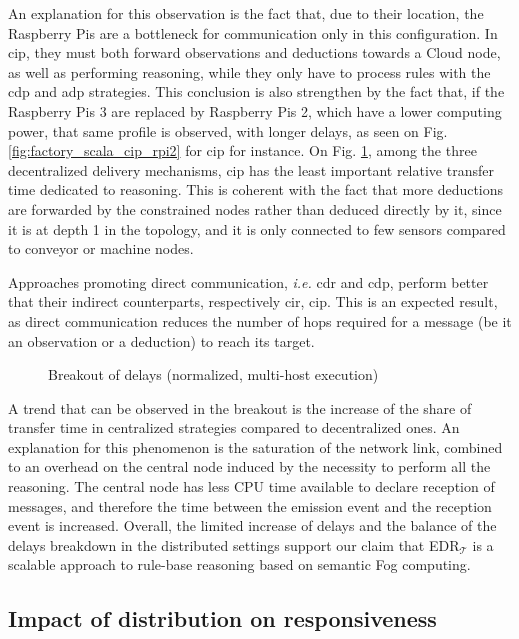 \documentclass{iosart2c}
\newcommand{\edrt}{EDR$_{\mathcal{T}}$\xspace}
\begin{document}
An explanation for this observation is the fact that, due to their location, the Raspberry Pis are a bottleneck for communication only in this configuration. 
In \gls{cip}, they must both forward observations and deductions towards a Cloud node, as well as performing reasoning, while they only have to process rules with the \gls{cdp} and \gls{adp} strategies.
This conclusion is also strengthen by the fact that, if the Raspberry Pis 3 are replaced by Raspberry Pis 2, which have a lower computing power, that same profile is observed, with longer delays, as seen on Fig. \ref{fig:factory_scala_cip_rpi2} for \gls{cip} for instance.
On Fig. \ref{fig:breakout_delays_rpi}, among the three decentralized delivery mechanisms, \gls{cip} has the least important relative transfer time dedicated to reasoning.
This is coherent with the fact that more deductions are forwarded by the constrained nodes rather than deduced directly by it, since it is at depth 1 in the topology, and it is only connected to few sensors compared to conveyor or machine nodes.

Approaches promoting direct communication, \textit{i.e.} \gls{cdr} and \gls{cdp}, perform better that their indirect counterparts, respectively \gls{cir}, \gls{cip}.
This is an expected result, as direct communication reduces the number of hops required for a message (be it an observation or a deduction) to reach its target.

\begin{figure}
	\caption{Breakout of delays (normalized, multi-host execution)}
	\label{fig:breakout_delays_rpi}
	\scalebox{0.75}{
		
	}
\end{figure}

A trend that can be observed in the breakout is the increase of the share of transfer time in centralized strategies compared to decentralized ones. 
An explanation for this phenomenon is the saturation of the network link, combined to an overhead on the central node induced by the necessity to perform all the reasoning. 
The central node has less CPU time available to declare reception of messages, and therefore the time between the emission event and the reception event is increased.
Overall, the limited increase of delays and the balance of the delays breakdown in the distributed settings support our claim that \edrt is a scalable approach to rule-base reasoning based on semantic Fog computing.

\subsection{Impact of distribution on responsiveness}
\label{subs:factory_distribution}
\end{document}
